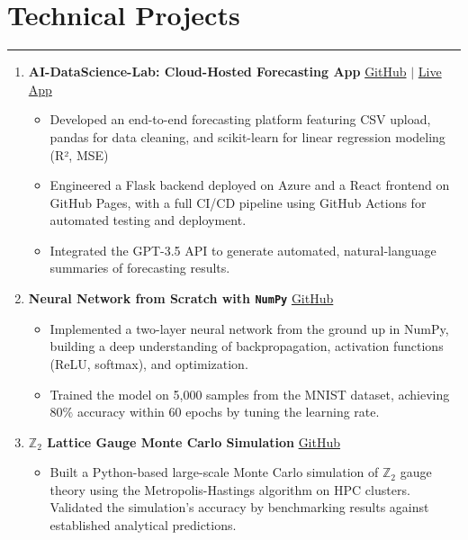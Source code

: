 \documentclass[11pt]{article}
\begin{document}
\section*{Technical Projects}
\hrule
\vspace{-0.3em}
\begin{enumerate}
    \item \textbf{AI-DataScience-Lab: Cloud-Hosted Forecasting App}  
    \hfill \href{https://github.com/Hariprashad-Ravikumar/AI-DataScience-Lab}{GitHub} $|$ \href{https://hariprashad-ravikumar.github.io/AI-DataScience-Lab}{Live App} \\
    \vspace{-2em}
    \begin{itemize}
    \item Developed an end-to-end forecasting platform featuring CSV upload, pandas for data cleaning, and scikit-learn for linear regression modeling (R², MSE)
    \vspace{-0.5em}
    \item Engineered a Flask backend deployed on Azure and a React frontend on GitHub Pages, with a full CI/CD pipeline using GitHub Actions for automated testing and deployment.
    \vspace{-0.5em}
    \item Integrated the GPT-3.5 API to generate automated, natural-language summaries of forecasting results.
    \end{itemize}
    

    \item \textbf{Neural Network from Scratch with \texttt{NumPy}}  
    \hfill \href{https://github.com/Hariprashad-Ravikumar/Neural-Network-from-Scratch-with-NumPy}{GitHub} \\
    \vspace{-2em}
    \begin{itemize}
        \item Implemented a two-layer neural network from the ground up in NumPy, building a deep understanding of backpropagation, activation functions (ReLU, softmax), and optimization.
        \vspace{-0.5em}
        \item Trained the model on 5,000 samples from the MNIST dataset, achieving $80\%$ accuracy within 60 epochs by tuning the learning rate.
    \end{itemize}

    \item \textbf{$\mathbb{Z}_2$ Lattice Gauge Monte Carlo Simulation}  
    \hfill \href{https://github.com/Hariprashad-Ravikumar/Z2_LatticeGauge_Monte_Carlo_Simulation}{GitHub} \\
    \vspace{-2em}
    \begin{itemize}
        \item Built a Python-based large-scale Monte Carlo simulation of $\mathbb{Z}_2$ gauge theory using the Metropolis-Hastings algorithm on HPC clusters. Validated the simulation's accuracy by benchmarking results against established analytical predictions.
    \end{itemize}
\end{enumerate}
\end{document}
